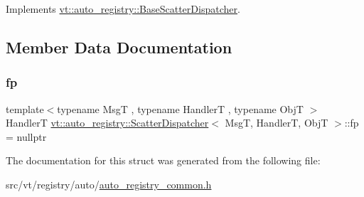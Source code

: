 Implements \hyperlink{structvt_1_1auto__registry_1_1_base_scatter_dispatcher_a73e838ab5c74e75c304dca8987d8971f}{vt\+::auto\+\_\+registry\+::\+Base\+Scatter\+Dispatcher}.



\subsection{Member Data Documentation}
\mbox{\label{structvt_1_1auto__registry_1_1_scatter_dispatcher_ab46d5400a04ca6282b2db43de7d0ca31}} 
\subsubsection{\texorpdfstring{fp}{fp}}
{\footnotesize\ttfamily template$<$typename MsgT , typename HandlerT , typename ObjT $>$ \\
HandlerT \hyperlink{structvt_1_1auto__registry_1_1_scatter_dispatcher}{vt\+::auto\+\_\+registry\+::\+Scatter\+Dispatcher}$<$ MsgT, HandlerT, ObjT $>$\+::fp = nullptr\hspace{0.3cm}{\ttfamily [private]}}



The documentation for this struct was generated from the following file\+:\begin{DoxyCompactItemize}
\item 
src/vt/registry/auto/\hyperlink{auto__registry__common_8h}{auto\+\_\+registry\+\_\+common.\+h}\end{DoxyCompactItemize}
